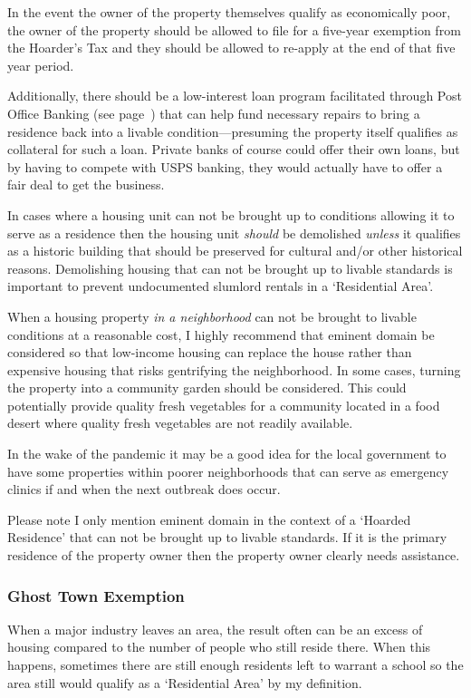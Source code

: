 In the event the owner of the property themselves qualify as economically poor, the owner of the property should be allowed to file for a five-year exemption from the Hoarder's Tax and they should be allowed to re-apply at the end of that five year period.

Additionally, there should be a low-interest loan program facilitated through Post Office Banking (see page~\pageref{USPS}) that can help fund necessary repairs to bring a residence back into a livable condition---presuming the property itself qualifies as collateral for such a loan. Private banks of course could offer their own loans, but by having to compete with USPS banking, they would actually have to offer a fair deal to get the business.

In cases where a housing unit can not be brought up to conditions allowing it to serve as a residence then the housing unit \emph{should} be demolished \emph{unless} it qualifies as a historic building that should be preserved for cultural and/or other historical reasons. Demolishing housing that can not be brought up to livable standards is important to prevent undocumented slumlord rentals in a `Residential Area'.

When a housing property \emph{in a neighborhood} can not be brought to livable conditions at a reasonable cost, I highly recommend that eminent domain be considered so that low-income housing can replace the house rather than expensive housing that risks gentrifying the neighborhood. In some cases, turning the property into a community garden should be considered. This could potentially provide quality fresh vegetables for a community located in a food desert where quality fresh vegetables are not readily available.

In the wake of the pandemic it may be a good idea for the local government to have some properties within poorer neighborhoods that can serve as emergency clinics if and when the next outbreak does occur.

Please note I only mention eminent domain in the context of a `Hoarded Residence' that can not be brought up to livable standards. If it is the primary residence of the property owner then the property owner clearly needs assistance.

\subsubsection{Ghost Town Exemption}

When a major industry leaves an area, the result often can be an excess of housing compared to the number of people who still reside there. When this happens, sometimes there are still enough residents left to warrant a school so the area still would qualify as a `Residential Area' by my definition.

